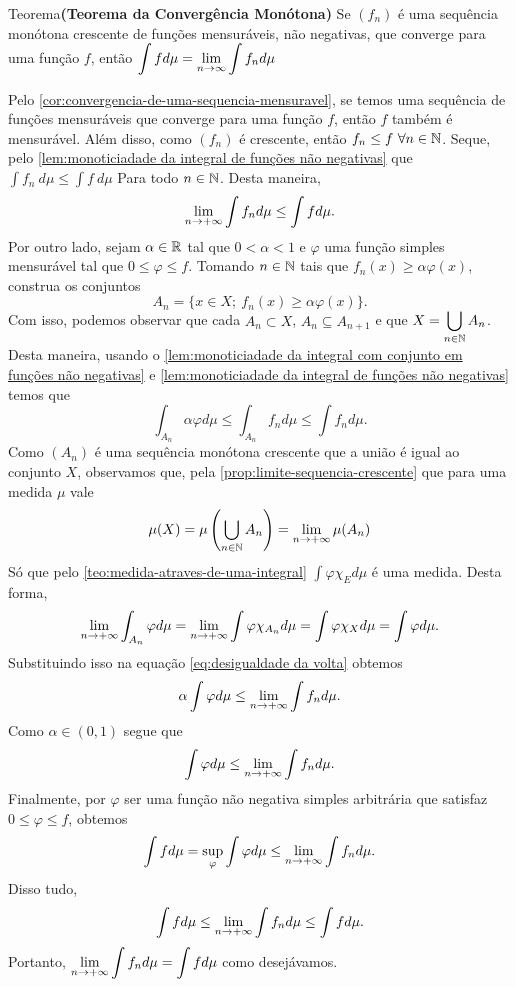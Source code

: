 \begin{env}{Teorema}\textbf{(Teorema da Convergência Monótona)}
	\label{teo:Convergencia Monótona}
	Se $(f_n)$ é uma sequência monótona crescente de funções mensuráveis, não negativas, que converge para uma função $f$, então
	$ \displaystyle
	\int f d\mu = \displaystyle \lim_{n \to \infty} \int f_n d\mu
	$
\end{env}
\begin{prova}
	Pelo \ref{cor:convergencia-de-uma-sequencia-mensuravel}, se temos uma sequência de funções mensuráveis que converge para uma função $f$, então $f$ também é mensurável.
	Além disso,
	como $(f_n)$ é crescente, então $f_n \leq f\ \forall n \in \operatorname{\mathbb{N}}$.
	Seque, pelo \ref{lem:monoticiadade da integral de funções não negativas} que 
	$ \displaystyle
	\int f_n\ d\mu \leq \int f\ d\mu
	$
	Para todo $n \in \operatorname{\mathbb{N}}$.
	Desta maneira, 
	$$
	\displaystyle \lim_{n \to +\infty}\int f_n d\mu \leq \int f d\mu.
	$$
	Por outro lado, sejam $\alpha \in \mathbb{R}$ tal que $0 < \alpha <1$ e 
	$\varphi$ uma função simples mensurável tal que $0 \leq \varphi \leq f$.
	Tomando $n \in \operatorname{\mathbb{N}}$ tais que $f_n(x) \geq \alpha \varphi(x)$, construa
	os conjuntos 
	$$
	A_n =\{x \in X ;\ f_n(x) \geq \alpha \varphi(x)\}.
	$$
	Com isso, podemos observar que cada $A_n \subset X$, $A_{n} \subseteq A_{n+1}$
	e que $X = \displaystyle \bigcup_{n \in \operatorname{\mathbb{N}}}A_n$.
	Desta maneira, usando o  \ref{lem:monoticiadade da integral com conjunto em funções não negativas} e \ref{lem:monoticiadade da integral de funções não negativas} temos que 
	\begin{equation}
		\label{eq:desigualdade da volta}
		\int_{A_n} \alpha\varphi d\mu
		\leq
		\int_{A_n} f_n d\mu
		\leq
		\int f_n d\mu.		
	\end{equation}
	Como $(A_n)$ é uma sequência monótona crescente que a união é igual ao conjunto $X$, observamos que, pela  \ref{prop:limite-sequencia-crescente} que para uma medida $\mu$ vale
	$$
	\mu(X) = \mu\left(\bigcup_{n \in \operatorname{\mathbb{N}}}A_n\right) = \lim_{n \to +\infty} \mu(A_n)
	$$
	Só que pelo  \ref{teo:medida-atraves-de-uma-integral} $\int \varphi \chi_E d\mu$ é uma medida.
	Desta forma, 
	$$
	\displaystyle \lim_{n \to +\infty} \int_{A_n} \varphi d\mu 
	= \displaystyle \lim_{n \to +\infty} \int \varphi \chi_{A_n} d\mu
	= \int \varphi \chi_X d\mu
	= \int \varphi d\mu.
	$$
	Substituindo isso na equação \ref{eq:desigualdade da volta} obtemos
	$$
	\alpha \int \varphi d\mu \leq \displaystyle \lim_{n \to +\infty} \int f_n d\mu.
	$$
	Como $\alpha \in (0,1)$ segue que
	$$
	\int \varphi d\mu \leq \displaystyle \lim_{n \to +\infty} \int f_n d\mu.
	$$
	Finalmente, por $\varphi$ ser uma função não negativa simples arbitrária que satisfaz $0\leq \varphi \leq f$, obtemos
	$$
	\int f d\mu 
	= \sup_{\varphi} \int \varphi d\mu \leq \displaystyle \lim_{n \to +\infty}\int f_n d\mu.
	$$
	Disso tudo,
	$$
	\int f d\mu 
	\leq 
	\displaystyle \lim_{n \to +\infty}\int f_n d\mu
	\leq
	\int f d\mu.
	$$
	Portanto,  $\displaystyle \displaystyle \lim_{n \to +\infty}\int f_n d\mu
	=
	\int f d\mu$ como desejávamos.
\end{prova}


